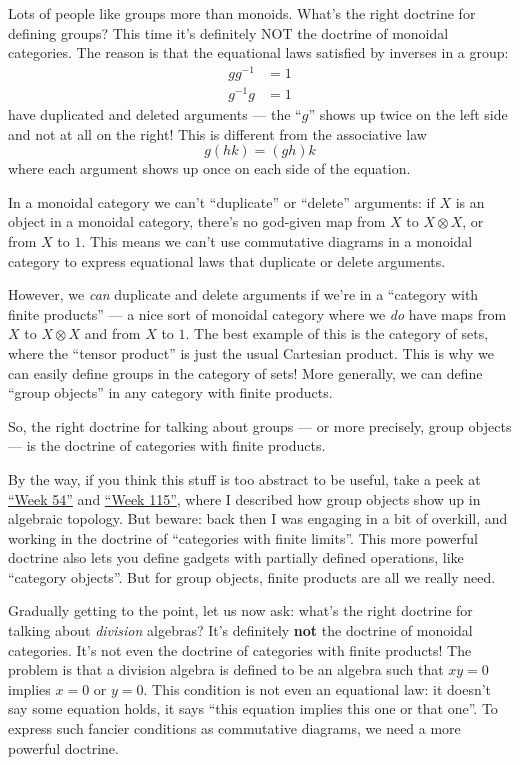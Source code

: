 \documentclass{article}
\begin{document}
Lots of people like groups more than monoids. What's the right doctrine
for defining groups? This time it's definitely NOT the doctrine of
monoidal categories. The reason is that the equational laws satisfied by
inverses in a group: \[
  \begin{aligned}
    g g^{-1} &= 1
  \\g^{-1} g &= 1
  \end{aligned}
\] have duplicated and deleted arguments --- the ``\(g\)'' shows up
twice on the left side and not at all on the right! This is different
from the associative law \[g (h k) = (g h) k\] where each argument shows
up once on each side of the equation.

In a monoidal category we can't ``duplicate'' or ``delete'' arguments:
if \(X\) is an object in a monoidal category, there's no god-given map
from \(X\) to \(X\otimes X\), or from \(X\) to \(1\). This means we
can't use commutative diagrams in a monoidal category to express
equational laws that duplicate or delete arguments.

However, we \emph{can} duplicate and delete arguments if we're in a
``category with finite products'' --- a nice sort of monoidal category
where we \emph{do} have maps from \(X\) to \(X\otimes X\) and from \(X\)
to \(1\). The best example of this is the category of sets, where the
``tensor product'' is just the usual Cartesian product. This is why we
can easily define groups in the category of sets! More generally, we can
define ``group objects'' in any category with finite products.

So, the right doctrine for talking about groups --- or more precisely,
group objects --- is the doctrine of categories with finite products.

By the way, if you think this stuff is too abstract to be useful, take a
peek at \protect\hyperlink{week54}{``Week 54''} and
\protect\hyperlink{week115}{``Week 115''}, where I described how group
objects show up in algebraic topology. But beware: back then I was
engaging in a bit of overkill, and working in the doctrine of
``categories with finite limits''. This more powerful doctrine also lets
you define gadgets with partially defined operations, like ``category
objects''. But for group objects, finite products are all we really
need.

Gradually getting to the point, let us now ask: what's the right
doctrine for talking about \emph{division} algebras? It's definitely
\textbf{not} the doctrine of monoidal categories. It's not even the
doctrine of categories with finite products! The problem is that a
division algebra is defined to be an algebra such that \(xy = 0\)
implies \(x = 0\) or \(y = 0\). This condition is not even an equational
law: it doesn't say some equation holds, it says ``this equation implies
this one or that one''. To express such fancier conditions as
commutative diagrams, we need a more powerful doctrine.
\end{document}
